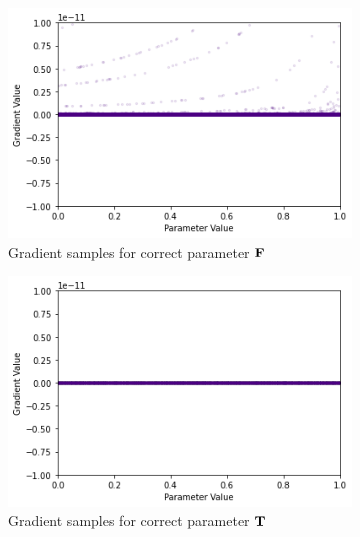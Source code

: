 \begin{figure}[h]
    \centering
    \begin{subfigure}[b]{0.47\textwidth}
        \centering
        \includegraphics[width=\textwidth]{imgs/grad_prod_10_falseparam_100dim.png}
        \caption{Gradient samples for correct parameter $\textbf{F}$}
        \label{fig:conjgrad10false100}
    \end{subfigure}
    \begin{subfigure}[b]{0.47\textwidth}
        \centering
        \includegraphics[width=\textwidth]{imgs/grad_prod_10_trueparam_100dim.png}
        \caption{Gradient samples for correct parameter $\textbf{T}$}
        \label{fig:conjgrad10true100}
    \end{subfigure}
    \begin{subfigure}[b]{0.47\textwidth}
        \centering

\end{subfigure}
\end{figure}
